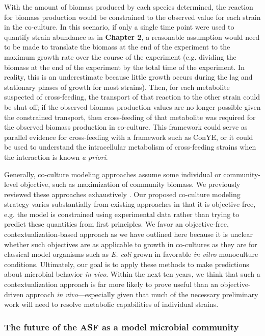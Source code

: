 \documentclass[11pt,twocolumn,notitlepage,openany,twoside]{book}
\begin{document}
\begin{refsection}
With the amount of biomass produced by each species determined, the reaction for biomass production would be constrained to the observed value for each strain in the co-culture. In this scenario, if only a single time point were used to quantify strain abundance as in \textbf{Chapter 2}, a reasonable assumption would need to be made to translate the biomass at the end of the experiment to the maximum growth rate over the course of the experiment (e.g. dividing the biomass at the end of the experiment by the total time of the experiment. In reality, this is an underestimate because little growth occurs during the lag and stationary phases of growth for most strains). Then, for each metabolite suspected of cross-feeding, the transport of that reaction to the other strain could be shut off; if the observed biomass production values are no longer possible given the constrained transport, then cross-feeding of that metabolite was required for the observed biomass production in co-culture. This framework could serve as parallel evidence for cross-feeding with a framework such as ConYE, or it could be used to understand the intracellular metabolism of cross-feeding strains when the interaction is known \textit{a priori}.

Generally, co-culture modeling approaches assume some individual or community-level objective, such as maximization of community biomass. We previously reviewed these approaches exhaustively \cite{Biggs2015-lz}. Our proposed co-culture modeling strategy varies substantially from existing approaches in that it is objective-free, e.g. the model is constrained using experimental data rather than trying to predict these quantities from first principles. We favor an objective-free, contextualization-based approach as we have outlined here because it is unclear whether such objectives are as applicable to growth in co-cultures as they are for classical model organisms such as \textit{E. coli} grown in favorable \textit{in vitro} monoculture conditions. Ultimately, our goal is to apply these methods to make predictions about microbial behavior \textit{in vivo}. Within the next ten years, we think that such a contextualization approach is far more likely to prove useful than an objective-driven approach \textit{in vivo}---especially given that much of the necessary preliminary work will need to resolve metabolic capabilities of individual strains.

\subsubsection{The future of the ASF as a model microbial community}


\end{refsection}
\end{document}

